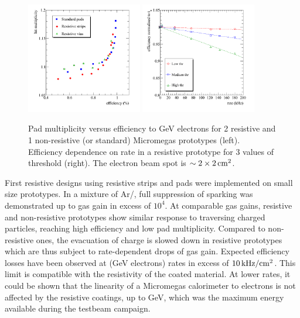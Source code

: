 \begin{figure}
\begin{centering}
\includegraphics[width=0.45\textwidth]{Calorimeter/SDHCal/splam_eff}
\includegraphics[width=0.45\textwidth]{Calorimeter/SDHCal/splam_rate}
\caption{Pad multiplicity versus efficiency to \unit[3]{GeV} electrons for 2 resistive and 1 non-resistive (or standard) Micromegas prototypes (left). Efficiency dependence on rate in a resistive prototype for 3 values of threshold (right). The electron beam spot is $\sim 2\times \unit[2]{cm^{2}}$.}
\label{resistive}
\end{centering}
\end{figure}

First resistive designs using resistive strips and pads were implemented on small size prototypes. In a mixture of Ar/, full suppression of sparking was demonstrated up to gas gain in excess of $10^{4}$. At comparable gas gains, resistive and non-resistive prototypes show similar response to traversing charged particles, reaching high efficiency and low pad multiplicity. Compared to non-resistive ones, the evacuation of charge is slowed down in resistive prototypes which are thus subject to rate-dependent drops of gas gain. Expected efficiency losses have been observed at (\unit[3]{GeV} electrons) rates in excess of $\unit[10]{kHz/cm^{2}}$. This limit is compatible with the resistivity of the coated material. At lower rates, it could be shown that the linearity of a Micromegas calorimeter to electrons is not affected by the resistive coatings, up to \unit[5]{GeV}, which was the maximum energy available during the testbeam campaign.

